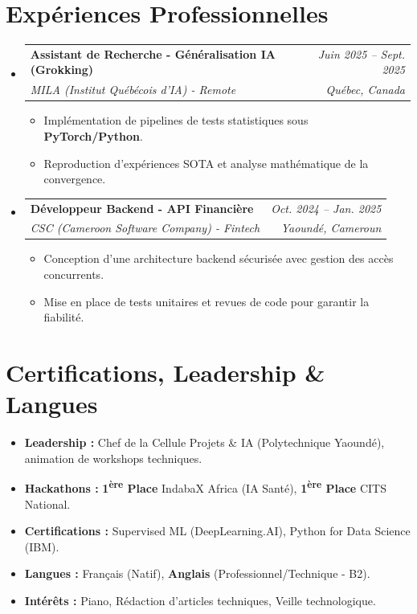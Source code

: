\documentclass[a4paper,11pt]{article}
\makeatletter
\newcommand{\resumeSubheading}[4]{
  \vspace{-1pt}\item
    \begin{tabular*}{0.97\textwidth}[t]{l@{\extracolsep{\fill}}r}
      \textbf{#1} & \textit{\small #2} \\
      \textit{\small #3} & \textit{\small #4} \\
    \end{tabular*}\vspace{-5pt}
}
\makeatother
\begin{document}
\section{Expériences Professionnelles}
\begin{itemize}[leftmargin=*, label={-}]

    \resumeSubheading
      {Assistant de Recherche - Généralisation IA (Grokking)}{Juin 2025 -- Sept. 2025}
      {MILA (Institut Québécois d'IA) - Remote}{Québec, Canada}
      \begin{itemize}[leftmargin=0.4cm, nosep, label=\tiny$\bullet$]
        \item \small{Implémentation de pipelines de tests statistiques sous \textbf{PyTorch/Python}.}
        \item \small{Reproduction d'expériences SOTA et analyse mathématique de la convergence.}
      \end{itemize}
    \vspace{2pt}

    \resumeSubheading
      {Développeur Backend - API Financière}{Oct. 2024 -- Jan. 2025}
      {CSC (Cameroon Software Company) - Fintech}{Yaoundé, Cameroun}
      \begin{itemize}[leftmargin=0.4cm, nosep, label=\tiny$\bullet$]
        \item \small{Conception d'une architecture backend sécurisée avec gestion des accès concurrents.}
        \item \small{Mise en place de tests unitaires et revues de code pour garantir la fiabilité.}
      \end{itemize}

\end{itemize}

\section{Certifications, Leadership \& Langues}
\begin{itemize}[leftmargin=*, nosep]
    \item \textbf{Leadership :} Chef de la Cellule Projets \& IA (Polytechnique Yaoundé), animation de workshops techniques.
    \item \textbf{Hackathons :} \textbf{1\textsuperscript{ère} Place} IndabaX Africa (IA Santé), \textbf{1\textsuperscript{ère} Place} CITS National.
    \item \textbf{Certifications :} Supervised ML (DeepLearning.AI), Python for Data Science (IBM).
    \item \textbf{Langues :} Français (Natif), \textbf{Anglais} (Professionnel/Technique - B2).
    \item \textbf{Intérêts :} Piano, Rédaction d'articles techniques, Veille technologique.
\end{itemize}
\end{document}
